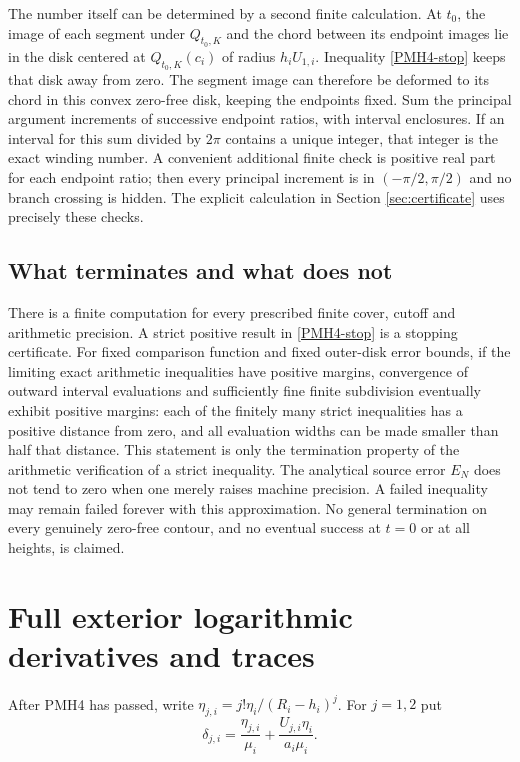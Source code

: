 \documentclass[11pt]{article}
\begin{document}
The number itself can be determined by a second finite calculation.
At $t_0$, the image of each segment under $Q_{t_0,K}$ and the chord
between its endpoint images lie in the disk centered at
$Q_{t_0,K}(c_i)$ of radius $h_iU_{1,i}$. Inequality
\eqref{PMH4-stop} keeps that disk away from zero. The segment image
can therefore be deformed to its chord in this convex zero-free disk,
keeping the endpoints fixed. Sum the principal argument increments
of successive endpoint ratios, with interval enclosures. If an
interval for this sum divided by $2\pi$ contains a unique integer,
that integer is the exact winding number. A convenient additional
finite check is positive real part for each endpoint ratio; then
every principal increment is in $(-\pi/2,\pi/2)$ and no branch
crossing is hidden. The explicit calculation in Section
\ref{sec:certificate} uses precisely these checks.

\subsection{What terminates and what does not}

There is a finite computation for every prescribed finite cover,
cutoff and arithmetic precision. A strict positive result in
\eqref{PMH4-stop} is a stopping certificate. For fixed comparison
function and fixed outer-disk error bounds, if the limiting exact
arithmetic inequalities have positive margins, convergence of
outward interval evaluations and sufficiently fine finite
subdivision eventually exhibit positive margins: each of the
finitely many strict inequalities has a positive distance from
zero, and all evaluation widths can be made smaller than half that
distance. This statement is only the termination property of the
arithmetic verification of a strict inequality.
The analytical source error $E_N$ does not tend to zero when one
merely raises machine precision. A failed inequality may remain
failed forever with this approximation. No general termination on
every genuinely zero-free contour, and no eventual success at
$t=0$ or at all heights, is claimed.

\section{Full exterior logarithmic derivatives and traces}

After PMH4 has passed, write $\eta_{j,i}=j!\eta_i/(R_i-h_i)^j$.
For $j=1,2$ put
\begin{equation}\label{PMH5-delta}
 \delta_{j,i}=\frac{\eta_{j,i}}{\mu_i}
       +\frac{U_{j,i}\eta_i}{a_i\mu_i}.
\end{equation}
\end{document}
